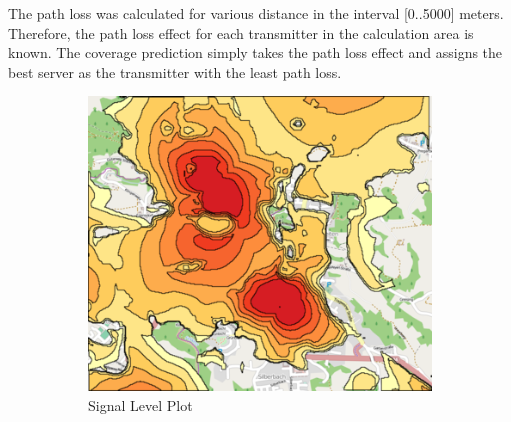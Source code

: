 \documentclass[master,english]{hgbthesis}
\begin{document}
The path loss was calculated for various distance in the interval [0..5000] meters. Therefore, the path loss effect for each transmitter in the calculation area is known. The coverage prediction simply takes the path loss effect and assigns the best server as the transmitter with the least path loss.

\begin{figure}

	\centering

	\begin{subfigure}[b]{0.45\textwidth}

		\includegraphics[width=\textwidth]{signallevelmapsmall.png}

		\caption{Signal Level Plot}

		\label{fig:signallevel}

	\end{subfigure}%

	~ %


	\begin{subfigure}[b]{0.45\textwidth}


\end{subfigure}
\end{figure}
\end{document}
